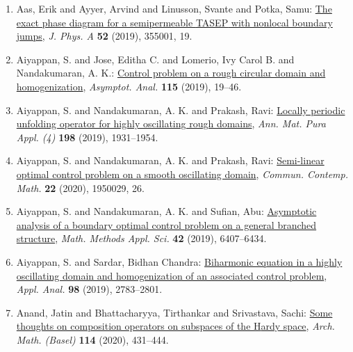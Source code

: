\medskip

\vspace{-2.5mm}

\begin{enumerate}[resume, leftmargin=27pt]
	\item Aas, Erik and Ayyer, Arvind and Linusson, Svante and Potka,
	      Samu: \href{https://doi.org/10.1088/1751-8121/ab2e96}{The exact phase diagram for a
		      semipermeable {TASEP} with nonlocal boundary jumps}, \emph{J. Phys. A} {\bf 52} (2019),
	      355001, 19.

	\item Aiyappan, S. and Jose, Editha C. and Lomerio, Ivy Carol B. and
	      Nandakumaran, A. K.: \href{https://doi.org/10.3233/asy-191526}{Control problem on a rough
		      circular domain and homogenization}, \emph{Asymptot. Anal.} {\bf 115} (2019), 19--46.

	\item Aiyappan, S. and Nandakumaran, A. K. and Prakash, Ravi: \href{https://doi.org/10.1007/s10231-019-00848-7}{Locally periodic unfolding operator for highly oscillating
		      rough domains}, \emph{Ann. Mat. Pura Appl. (4)} {\bf 198} (2019), 1931--1954.

	\item Aiyappan, S. and Nandakumaran, A. K. and Prakash, Ravi: \href{https://doi.org/10.1142/S0219199719500299}{Semi-linear optimal control problem on a smooth oscillating
		      domain}, \emph{Commun. Contemp. Math.} {\bf 22} (2020), 1950029, 26.

	\item Aiyappan, S. and Nandakumaran, A. K. and Sufian, Abu: \href{https://doi.org/10.1002/mma.5748}{Asymptotic analysis of a boundary optimal control problem on a general branched structure}, \emph{Math. Methods Appl. Sci.} {\bf 42} (2019), 6407--6434.

	\item Aiyappan, S. and Sardar, Bidhan Chandra: \href{https://doi.org/10.1080/00036811.2018.1471207}{Biharmonic equation in a highly oscillating domain and
		      homogenization of an associated control problem}, \emph{Appl. Anal.} {\bf 98} (2019), 2783--2801.

	\item Anand, Jatin and Bhattacharyya, Tirthankar and Srivastava,
	      Sachi: \href{https://doi.org/10.1007/s00013-019-01406-6}{Some thoughts on composition operators on subspaces of the
			      {H}ardy space}, \emph{Arch. Math. (Basel)} {\bf 114} (2020), 431--444.


\end{enumerate}
